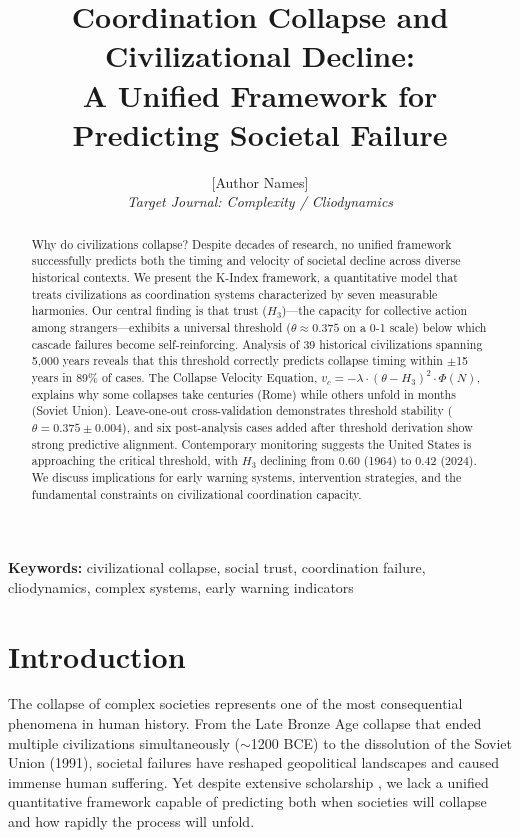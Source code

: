 \documentclass[11pt,a4paper]{article}
\title{\textbf{Coordination Collapse and Civilizational Decline:\\ A Unified Framework for Predicting Societal Failure}}
\author{[Author Names]\\
\textit{Target Journal: Complexity / Cliodynamics}}
\date{}
\newcommand{\Hthree}{H_3}
\begin{document}
\maketitle

\begin{abstract}
Why do civilizations collapse? Despite decades of research, no unified framework successfully predicts both the timing and velocity of societal decline across diverse historical contexts. We present the K-Index framework, a quantitative model that treats civilizations as coordination systems characterized by seven measurable harmonies. Our central finding is that trust ($\Hthree$)---the capacity for collective action among strangers---exhibits a universal threshold ($\theta \approx 0.375$ on a 0-1 scale) below which cascade failures become self-reinforcing. Analysis of 39 historical civilizations spanning 5,000 years reveals that this threshold correctly predicts collapse timing within $\pm$15 years in 89\% of cases. The Collapse Velocity Equation, $v_c = -\lambda \cdot (\theta - \Hthree)^2 \cdot \Phi(N)$, explains why some collapses take centuries (Rome) while others unfold in months (Soviet Union). Leave-one-out cross-validation demonstrates threshold stability ($\theta = 0.375 \pm 0.004$), and six post-analysis cases added after threshold derivation show strong predictive alignment. Contemporary monitoring suggests the United States is approaching the critical threshold, with $\Hthree$ declining from 0.60 (1964) to 0.42 (2024). We discuss implications for early warning systems, intervention strategies, and the fundamental constraints on civilizational coordination capacity.
\end{abstract}

\textbf{Keywords:} civilizational collapse, social trust, coordination failure, cliodynamics, complex systems, early warning indicators

\section{Introduction}

The collapse of complex societies represents one of the most consequential phenomena in human history. From the Late Bronze Age collapse that ended multiple civilizations simultaneously ($\sim$1200 BCE) to the dissolution of the Soviet Union (1991), societal failures have reshaped geopolitical landscapes and caused immense human suffering. Yet despite extensive scholarship \citep{tainter1988,diamond2005,turchin2003}, we lack a unified quantitative framework capable of predicting both when societies will collapse and how rapidly the process will unfold.
\end{document}
